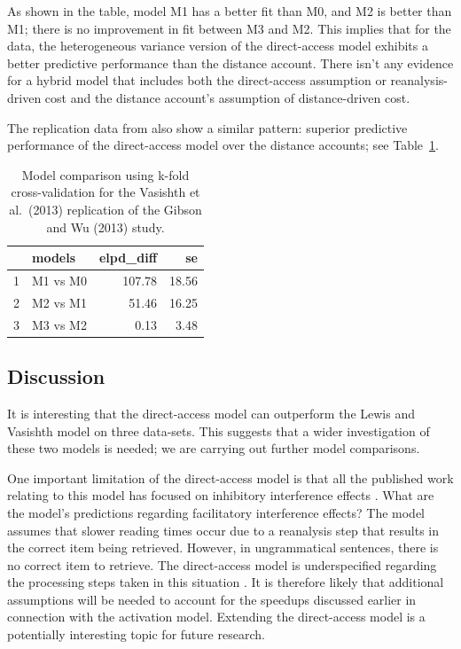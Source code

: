 \documentclass{cambridge7A}\usepackage[]{graphicx}\usepackage[]{color}
\begin{document}
As shown in the table, model M1 has  a better fit than M0, and M2 is better than M1; there is no improvement in fit between M3 and M2. This implies that for the \cite{gibsonwu} data, the heterogeneous variance version of the direct-access model exhibits a better predictive performance than the distance account. There isn't any evidence for a hybrid model that includes both the direct-access assumption or reanalysis-driven cost and the distance account's assumption of distance-driven cost.

The replication data from \cite{VasishthChenLi2013} also show a similar pattern: superior predictive performance of the direct-access model over the distance accounts; see Table~\ref{tab:modcompgibsonwurep}. 

\begin{table}[!htbp]
\centering
\begin{tabular}{rlrr}
  \hline
 & models & elpd\_diff & se \\ 
  \hline
1 & M1 vs M0 & 107.78 & 18.56 \\ 
  2 & M2 vs M1 & 51.46 & 16.25 \\
  3 & M3 vs M2 & 0.13 & 3.48 \\
   \hline
\end{tabular}
\caption{Model comparison using k-fold cross-validation for the Vasishth et al.\ (2013) replication of the Gibson and Wu (2013) study.} 
\label{tab:modcompgibsonwurep}
\end{table}

\subsection{Discussion}

It is interesting that the direct-access model can outperform the Lewis and Vasishth model on three data-sets. This suggests that a wider investigation of these two models is needed; we are carrying out further model comparisons.

One important limitation of the direct-access model is that all the published work relating to this model has focused on inhibitory interference effects \citep{VasishthEtAlTiCS2019}. What are the model's predictions regarding facilitatory interference effects? The model assumes that slower reading times occur due to a reanalysis step that results in the correct item being retrieved. However, in ungrammatical sentences, there is no correct item to retrieve. The direct-access model is underspecified regarding the processing steps taken in this situation \citep{NicenboimRetrieval2018}. It is therefore likely that additional assumptions will be needed to account for the speedups discussed earlier in connection with the activation model. Extending the direct-access model is a potentially interesting topic for future research.
\end{document}
